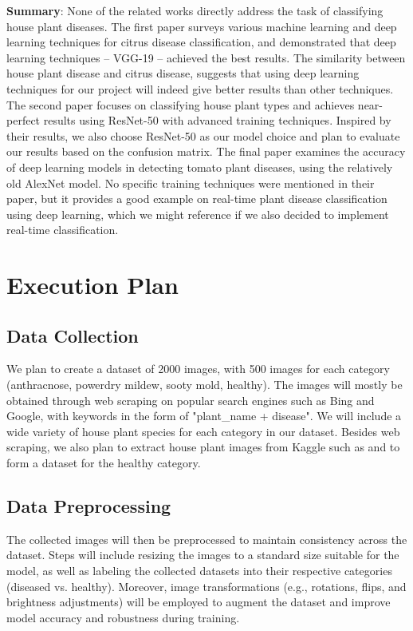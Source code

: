 \documentclass[12pt]{article}
\begin{document}
\textbf{Summary}: None of the related works directly address the task of classifying house plant diseases. The first paper surveys various machine learning and deep learning techniques for citrus disease classification, and demonstrated that deep learning techniques -- VGG-19 -- achieved the best results. The similarity between house plant disease and citrus disease, suggests that using deep learning techniques for our project will indeed give better results than other techniques. The second paper focuses on classifying house plant types and achieves near-perfect results using ResNet-50 with advanced training techniques. Inspired by their results, we also choose ResNet-50 as our model choice and plan to evaluate our results based on the confusion matrix. The final paper examines the accuracy of deep learning models in detecting tomato plant diseases, using the relatively old AlexNet model. No specific training techniques were mentioned in their paper, but it provides a good example on real-time plant disease classification using deep learning, which we might reference if we also decided to implement real-time classification.


\section{Execution Plan}
\subsection{Data Collection}
We plan to create a dataset of 2000 images, with 500 images for each category (anthracnose, powerdry mildew, sooty mold, healthy). The images will mostly be obtained through web scraping on popular search engines such as Bing and Google, with keywords in the form of "plant\_name + disease". We will include a wide variety of house plant species for each category in our dataset. Besides web scraping, we also plan to extract house plant images from Kaggle such as  \cite{HPSD} and \cite{HWHP} to form a dataset for the healthy category.




\subsection{Data Preprocessing}
The collected images will then be preprocessed to maintain consistency across the dataset. Steps will include resizing the images to a standard size suitable for the model, as well as labeling the collected datasets into their respective categories (diseased vs. healthy). Moreover, image transformations (e.g., rotations, flips, and brightness adjustments) will be employed to augment the dataset and improve model accuracy and robustness during training.
\end{document}
